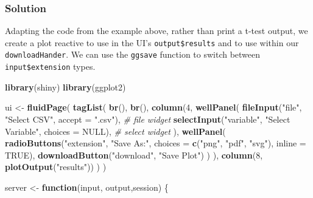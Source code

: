 \documentclass[]{book}
\newenvironment{Shaded}{\begin{snugshade}}{\end{snugshade}}
\newcommand{\CommentTok}[1]{\textcolor[rgb]{0.56,0.35,0.01}{\textit{#1}}}
\newcommand{\ControlFlowTok}[1]{\textcolor[rgb]{0.13,0.29,0.53}{\textbf{#1}}}
\newcommand{\DataTypeTok}[1]{\textcolor[rgb]{0.13,0.29,0.53}{#1}}
\newcommand{\DecValTok}[1]{\textcolor[rgb]{0.00,0.00,0.81}{#1}}
\newcommand{\KeywordTok}[1]{\textcolor[rgb]{0.13,0.29,0.53}{\textbf{#1}}}
\newcommand{\NormalTok}[1]{#1}
\newcommand{\OtherTok}[1]{\textcolor[rgb]{0.56,0.35,0.01}{#1}}
\newcommand{\StringTok}[1]{\textcolor[rgb]{0.31,0.60,0.02}{#1}}
\begin{document}
\begin{solution}

\hypertarget{solution-2}{%
\subsubsection*{Solution}\label{solution-2}}

Adapting the code from the example above, rather than print a t-test output, we create a plot reactive to use in the UI's \texttt{output\$results} and to use within our \texttt{downloadHander}. We can use the \texttt{ggsave} function to switch between \texttt{input\$extension} types.

\begin{Shaded}
\begin{Highlighting}[]
\KeywordTok{library}\NormalTok{(shiny)}
\KeywordTok{library}\NormalTok{(ggplot2)}

\NormalTok{ui <-}\StringTok{ }\KeywordTok{fluidPage}\NormalTok{(}
    \KeywordTok{tagList}\NormalTok{(}
        \KeywordTok{br}\NormalTok{(), }\KeywordTok{br}\NormalTok{(),}
        \KeywordTok{column}\NormalTok{(}\DecValTok{4}\NormalTok{,}
               \KeywordTok{wellPanel}\NormalTok{(}
                   \KeywordTok{fileInput}\NormalTok{(}\StringTok{"file"}\NormalTok{, }\StringTok{"Select CSV"}\NormalTok{, }\DataTypeTok{accept =} \StringTok{".csv"}\NormalTok{), }\CommentTok{# file widget}
                   \KeywordTok{selectInput}\NormalTok{(}\StringTok{"variable"}\NormalTok{, }\StringTok{"Select Variable"}\NormalTok{, }\DataTypeTok{choices =} \OtherTok{NULL}\NormalTok{), }\CommentTok{# select widget}
\NormalTok{               ),}
               \KeywordTok{wellPanel}\NormalTok{(}
                   \KeywordTok{radioButtons}\NormalTok{(}\StringTok{"extension"}\NormalTok{, }\StringTok{"Save As:"}\NormalTok{, }\DataTypeTok{choices =} \KeywordTok{c}\NormalTok{(}\StringTok{"png"}\NormalTok{, }\StringTok{"pdf"}\NormalTok{, }\StringTok{"svg"}\NormalTok{), }\DataTypeTok{inline =} \OtherTok{TRUE}\NormalTok{),}
                   \KeywordTok{downloadButton}\NormalTok{(}\StringTok{"download"}\NormalTok{, }\StringTok{"Save Plot"}\NormalTok{)}
\NormalTok{               )}
\NormalTok{             ),}
        \KeywordTok{column}\NormalTok{(}\DecValTok{8}\NormalTok{, }\KeywordTok{plotOutput}\NormalTok{(}\StringTok{"results"}\NormalTok{))}
\NormalTok{    )}
\NormalTok{)}

\NormalTok{server <-}\StringTok{ }\ControlFlowTok{function}\NormalTok{(input, output,session) \{}


\end{Highlighting}
\end{Shaded}
\end{solution}
\end{document}
